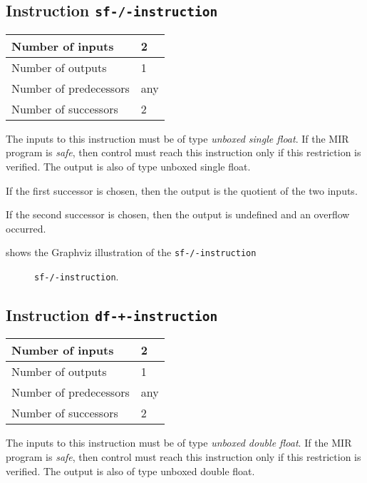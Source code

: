 \subsection{Instruction \texttt{sf-/-instruction}}
\label{mir-instruction-sf-/}

\begin{tabular}{|l|l|}
\hline
Number of inputs & 2\\
\hline
Number of outputs & 1\\
\hline
Number of predecessors & any\\
\hline
Number of successors & 2\\
\hline
\end{tabular}

The inputs to this instruction must be of type \emph{unboxed single
  float}.  If the MIR program is \emph{safe}, then control must reach
this instruction only if this restriction is verified.  The output is
also of type unboxed single float.

If the first successor is chosen, then the output is
the quotient of the two inputs.  

If the second successor is chosen, then the output is undefined and an
overflow occurred. 

 shows the Graphviz illustration of the
\texttt{sf-/-instruction}

\begin{figure}
\begin{center}
\end{center}
\caption{\label{fig-sf-/-instruction}
\texttt{sf-/-instruction}.}
\end{figure}

\subsection{Instruction \texttt{df-+-instruction}}
\label{mir-instruction-df-+}

\begin{tabular}{|l|l|}
\hline
Number of inputs & 2\\
\hline
Number of outputs & 1\\
\hline
Number of predecessors & any\\
\hline
Number of successors & 2\\
\hline
\end{tabular}

The inputs to this instruction must be of type \emph{unboxed double
  float}.  If the MIR program is \emph{safe}, then control must reach
this instruction only if this restriction is verified.  The output is
also of type unboxed double float.

